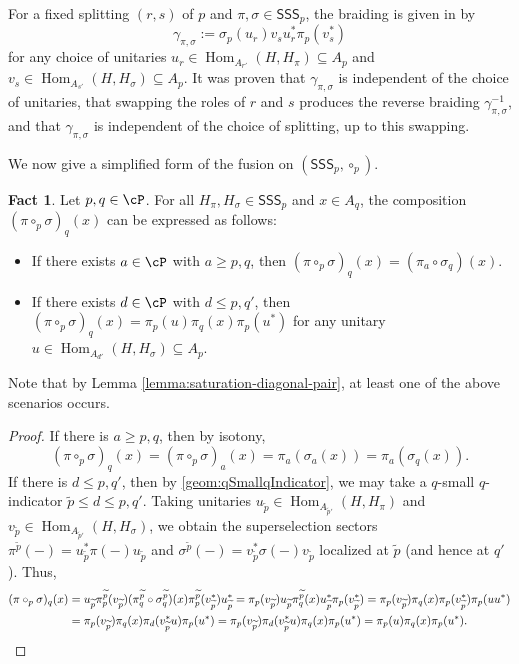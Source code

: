 \documentclass[11pt,reqno]{amsart}
\DeclareMathOperator{\Hom}{Hom}
\newcommand{\SSS}{\mathsf{SSS}}
\numberwithin{equation}{section}
\theoremstyle{plain}
\theoremstyle{definition}
\newtheorem{fact}[equation]{Fact}
\begin{document}
For a fixed splitting $(r,s)$ of $p$ and $\pi,\sigma\in\SSS_p$, the braiding is given in \cite{MR4927814} by
\[
\gamma_{\pi,\sigma}:=\sigma_p(u_r)v_su_r^*\pi_p(v_s^*)
\]
for any choice of unitaries $u_r\in\Hom_{A_{r'}}(H,H_\pi)\subseteq A_p$ and $v_s\in\Hom_{A_{s'}}(H,H_\sigma)\subseteq A_p$.
It was proven that $\gamma_{\pi,\sigma}$ is independent of the choice of unitaries, that swapping the roles of $r$ and $s$ produces the reverse braiding $\gamma_{\pi,\sigma}^{-1}$, and that $\gamma_{\pi,\sigma}$ is independent of the choice of splitting, up to this swapping.

We now give a simplified form of the fusion on $(\SSS_p, \circ_p)$.

\begin{fact}
    Let $p,q\in{\cP}$. For all $H_\pi,H_\sigma\in\SSS_p$ and $x\in A_q$, the composition $(\pi\circ_p\sigma)_q(x)$ can be expressed as follows:
    \begin{itemize}
        \item If there exists $a\in{\cP}$ with $a\geq p,q$, then
        $
        (\pi\circ_p\sigma)_q(x)=(\pi_a\circ\sigma_q)(x).
        $
        
        \item If there exists $d\in{\cP}$ with $d\leq p,q'$, then
        $        (\pi\circ_p\sigma)_q(x)=\pi_p(u)\pi_q(x)\pi_p(u^*)
        $
        for any unitary $u\in\Hom_{A_{d'}}(H,H_\sigma)\subseteq A_p$.
    \end{itemize}
    Note that by Lemma \ref{lemma:saturation-diagonal-pair}, at least one of the above scenarios occurs.
\end{fact}

\begin{proof}
    If there is $a\geq p,q$, then by isotony,
    \[
    (\pi\circ_p\sigma)_q(x)=(\pi\circ_p\sigma)_a(x)=\pi_a(\sigma_a(x))=\pi_a(\sigma_q(x)).
    \]
    If there is $d\leq p,q'$, then by \ref{geom:qSmallqIndicator}, we may take a $q$-small $q$-indicator $\widetilde{p}\leq d\leq p,q'$. Taking unitaries $u_{\widetilde{p}}\in\Hom_{A_{\widetilde{p}'}}(H,H_\pi)$ and $v_{\widetilde{p}}\in\Hom_{A_{\widetilde{p}'}}(H,H_\sigma)$, we obtain the superselection sectors $\pi^{\widetilde{p}}(-)=u_{\widetilde{p}}^*\pi(-)u_{\widetilde{p}}$ and $\sigma^{\widetilde{p}}(-)=v_{\widetilde{p}}^*\sigma(-)v_{\widetilde{p}}$ localized at $\widetilde{p}$ (and hence at $q'$). Thus,
    \begin{align*}
        (\pi\circ_p\sigma)_q(x)
        &=u_{\widetilde{p}}\pi^{\widetilde{p}}_p(v_{\widetilde{p}})(\pi^{\widetilde{p}}_q\circ\sigma^{\widetilde{p}}_q)(x)\pi^{\widetilde{p}}_p(v_{\widetilde{p}}^*)u_{\widetilde{p}}^*
        =\pi_p(v_{\widetilde{p}})u_{\widetilde{p}}\pi^{\widetilde{p}}_q(x)u_{\widetilde{p}}^*\pi_p(v_{\widetilde{p}}^*)
        =\pi_p(v_{\widetilde{p}})\pi_q(x)\pi_p(v_{\widetilde{p}}^*)\pi_p(uu^*) \\
        &=\pi_p(v_{\widetilde{p}})\pi_q(x)\pi_d(v_{\widetilde{p}}^*u)\pi_p(u^*)
        =\pi_p(v_{\widetilde{p}})\pi_d(v_{\widetilde{p}}^*u)\pi_q(x)\pi_p(u^*) 
        =\pi_p(u)\pi_q(x)\pi_p(u^*).
        \qedhere
    \end{align*}
\end{proof}
\end{document}
